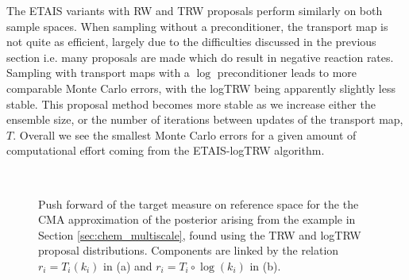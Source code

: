 \documentclass[final]{siamltex}
\begin{document}
The ETAIS variants with RW and TRW proposals perform similarly on both
sample spaces. When sampling without a preconditioner, the transport map is not
quite as efficient, largely due to the difficulties discussed in the
previous section i.e. many proposals are made which do result in
negative reaction rates. Sampling with transport maps with a $\log$ preconditioner leads to more comparable Monte Carlo errors, with the logTRW being apparently slightly less stable. This proposal method becomes more stable as we increase either the ensemble size, or the number of iterations between updates of the transport map, $T$. Overall we see the smallest Monte Carlo errors for a given amount of computational effort coming from the ETAIS-logTRW algorithm.

\begin{figure}[!htb]
\centering
{}
\\
\caption{Push forward of the target measure on reference space for the the CMA
  approximation of the  posterior arising from the example in Section \ref{sec:chem_multiscale}, found using the TRW and logTRW proposal distributions. Components are linked by the relation $r_i = T_i(k_i)$ in (a) and $r_i = T_i\circ\log(k_i)$ in (b).}
\label{fig:chem_reference_spaces}
\end{figure}
\end{document}
